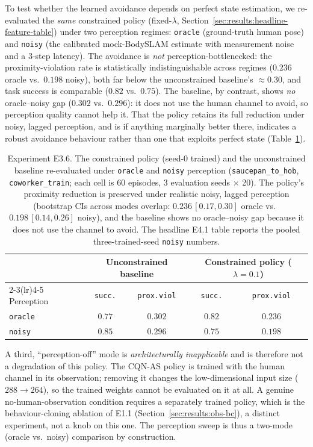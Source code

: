 \documentclass[11pt,a4paper]{report}
\newcommand{\cqnas}{CQN-AS}
\newcommand{\bodyslampp}{BodySLAM\nolinebreak[4]\hspace{-.05em}\raisebox{.2ex}{\scriptsize ++}}
\begin{document}
To test whether the learned avoidance depends on perfect state
estimation, we re-evaluated the \emph{same} constrained policy
(fixed-$\lambda$, Section~\ref{sec:results:headline-feature-table})
under two perception regimes: \texttt{oracle} (ground-truth human
pose) and \texttt{noisy} (the calibrated mock-\bodyslampp{} estimate
with measurement noise and a 3-step latency). The avoidance is
\emph{not} perception-bottlenecked: the proximity-violation rate is
statistically indistinguishable across regimes ($0.236$ oracle vs.\
$0.198$ noisy), both far below the unconstrained baseline's
$\approx$0.30, and task success is comparable ($0.82$ vs.\ $0.75$).
The baseline, by contrast, shows \emph{no} oracle--noisy gap ($0.302$
vs.\ $0.296$): it does not use the human channel to avoid, so
perception quality cannot help it. That the policy retains its full
reduction under noisy, lagged perception, and is if anything
marginally better there, indicates a robust avoidance behaviour
rather than one that exploits perfect state
(Table~\ref{tab:e3.6-obs-rl}).

\begin{table}[h]
\centering
\caption{Experiment E3.6. The constrained policy (seed-0 trained)
and the unconstrained baseline re-evaluated under \texttt{oracle} and
\texttt{noisy} perception (\texttt{saucepan\_to\_hob},
\texttt{coworker\_train}; each cell is 60 episodes, 3 evaluation
seeds $\times$ 20). The policy's proximity reduction is preserved
under realistic noisy, lagged perception (bootstrap CIs across modes
overlap: $0.236\,[0.17, 0.30]$ oracle vs.\ $0.198\,[0.14, 0.26]$
noisy), and the baseline shows no oracle--noisy gap because it does
not use the channel to avoid. The headline E4.1 table reports the
pooled three-trained-seed \texttt{noisy} numbers.}
\label{tab:e3.6-obs-rl}
\small
\begin{tabular}{lcccc}
\toprule
 & \multicolumn{2}{c}{Unconstrained baseline} & \multicolumn{2}{c}{Constrained policy ($\lambda{=}0.1$)} \\
\cmidrule(lr){2-3}\cmidrule(lr){4-5}
Perception & \texttt{succ.} & \texttt{prox.viol} & \texttt{succ.} & \texttt{prox.viol} \\
\midrule
\texttt{oracle} & $0.77$ & $0.302$ & $0.82$ & $0.236$ \\
\texttt{noisy}  & $0.85$ & $0.296$ & $0.75$ & $0.198$ \\
\bottomrule
\end{tabular}
\end{table}

A third, ``perception-off'' mode is \emph{architecturally
inapplicable} and is therefore not a degradation of this policy. The
\cqnas{} policy is trained with the human channel in its observation;
removing it changes the low-dimensional input size ($288 \to 264$), so
the trained weights cannot be evaluated on it at all. A genuine
no-human-observation condition requires a separately trained policy,
which is the behaviour-cloning ablation of E1.1
(Section~\ref{sec:results:obs-bc}), a distinct experiment, not a knob
on this one. The perception sweep is thus a two-mode (oracle vs.\
noisy) comparison by construction.
\end{document}
